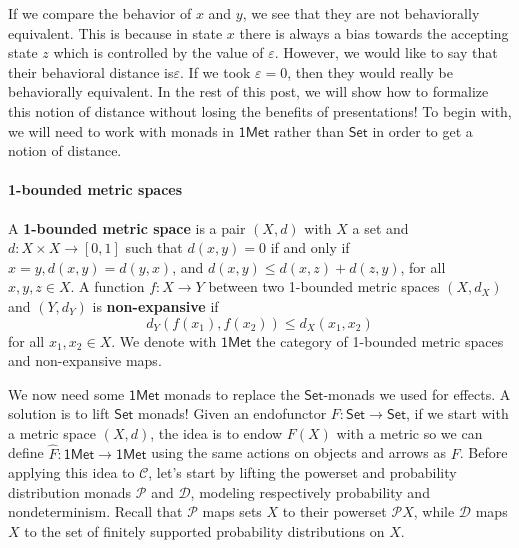 \documentclass{article}
\newcommand{\cat}[1]{\mathsf{#1}}
\newcommand{\C}{\mathcal C}
\begin{document}
If we compare the behavior of $x$ and $y$, we see that they are not behaviorally equivalent. This is because in state $x$ there is always a bias towards the accepting state $z$ which is controlled by the value of $\varepsilon$. However, we would like to say that their behavioral distance is$\varepsilon$. %
If we took $\varepsilon = 0$, then they would really be behaviorally equivalent.
In the rest of this post, we will show how to formalize this notion of distance without losing the benefits of presentations!
To begin with, we will need to work with monads in $\cat{1Met}$ rather than $\cat{Set}$ in order to get a notion of distance.


\paragraph{1-bounded metric spaces}

A \textbf{1-bounded metric space} is a pair $(X, d)$ with $X$ a set and $d \colon X \times X \to [0,1]$ such that $d(x, y) = 0$ if and only if $x = y, d(x, y) = d(y, x)$, and $d(x, y) \leq d(x, z) + d(z, y)$, for all $x, y, z \in X$. A function $f \colon X \to Y$ between two 1-bounded metric spaces $(X, d_X)$ and $(Y, d_Y)$ is \textbf{non-expansive} if $$d_Y (f (x_1), f (x_2)) \leq d_X (x_1, x_2)$$ for all $x_1, x_2 \in X$. We denote with $\cat{1Met}$ the category of 1-bounded metric spaces and non-expansive maps.%

We now need some $\cat{1Met}$ monads to replace the $\cat{Set}$-monads we used for effects. A solution is to lift $\cat{Set}$ monads! Given an endofunctor $F \colon \cat{Set} \to \cat{Set}$, if we start with a metric space $(X,d)$, the idea is to endow $F(X)$ with a metric so we can define $\hat F \colon \cat{1Met} \to \cat{1Met}$ using the same actions on objects and arrows as $F$. Before applying this idea to $\C$, let's start by lifting the powerset and probability distribution monads $\mathcal{P}$ and $\mathcal{D}$, modeling respectively probability and nondeterminism.
Recall that $\mathcal P$ maps sets $X$ to their powerset $\mathcal P X$, while $\mathcal D$ maps $X$ to the set of finitely supported probability distributions on $X$.
\end{document}
